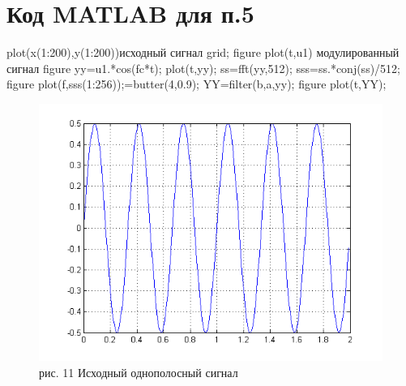 \documentclass[10pt,a4paper]{report}
\begin{document}
\chapter{Код MATLAB для п.5}
plot(x(1:200),y(1:200))исходный сигнал\newline
grid;\newline
figure\newline
plot(t,u1) модулированный сигнал\newline
figure\newline
yy=u1.*cos(fc*t);\newline
plot(t,yy);\newline
ss=fft(yy,512);\newline
sss=ss.*conj(ss)/512;\newline
figure\newline
plot(f,sss(1:256));\newline
[b,a]=butter(4,0.9);\newline
YY=filter(b,a,yy);\newline
figure\newline
plot(t,YY);\newline
\begin{figure}
\begin{center}
\includegraphics[angle=0, scale = 0.8]{1_1.png}\newline
рис. 11  Исходный однополосный сигнал\newline
\end{center}
\end{figure}
\end{document}
